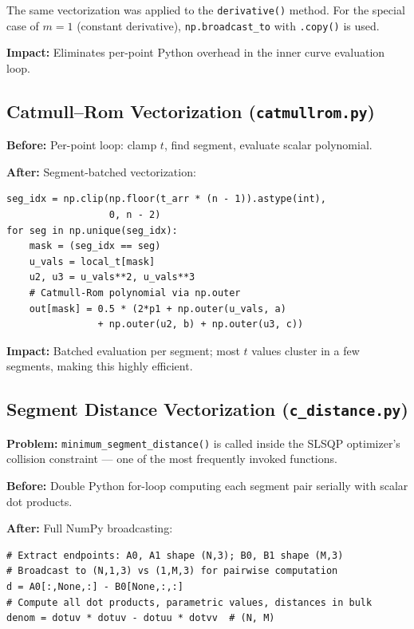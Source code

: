 \documentclass[11pt,a4paper]{article}
\begin{document}
The same vectorization was applied to the \texttt{derivative()} method. For the special case of $m=1$ (constant derivative), \texttt{np.broadcast\_to} with \texttt{.copy()} is used.

\textbf{Impact:} Eliminates per-point Python overhead in the inner curve evaluation loop.

\subsection{Catmull--Rom Vectorization (\texttt{catmullrom.py})}

\textbf{Before:} Per-point loop: clamp $t$, find segment, evaluate scalar polynomial.

\textbf{After:} Segment-batched vectorization:
\begin{lstlisting}
seg_idx = np.clip(np.floor(t_arr * (n - 1)).astype(int),
                  0, n - 2)
for seg in np.unique(seg_idx):
    mask = (seg_idx == seg)
    u_vals = local_t[mask]
    u2, u3 = u_vals**2, u_vals**3
    # Catmull-Rom polynomial via np.outer
    out[mask] = 0.5 * (2*p1 + np.outer(u_vals, a)
                + np.outer(u2, b) + np.outer(u3, c))
\end{lstlisting}

\textbf{Impact:} Batched evaluation per segment; most $t$ values cluster in a few segments, making this highly efficient.

\subsection{Segment Distance Vectorization (\texttt{c\_distance.py})}

\textbf{Problem:} \texttt{minimum\_segment\_distance()} is called inside the SLSQP optimizer's collision constraint --- one of the most frequently invoked functions.

\textbf{Before:} Double Python for-loop computing each segment pair serially with scalar dot products.

\textbf{After:} Full NumPy broadcasting:
\begin{lstlisting}
# Extract endpoints: A0, A1 shape (N,3); B0, B1 shape (M,3)
# Broadcast to (N,1,3) vs (1,M,3) for pairwise computation
d = A0[:,None,:] - B0[None,:,:]
# Compute all dot products, parametric values, distances in bulk
denom = dotuv * dotuv - dotuu * dotvv  # (N, M)
\end{lstlisting}
\end{document}
